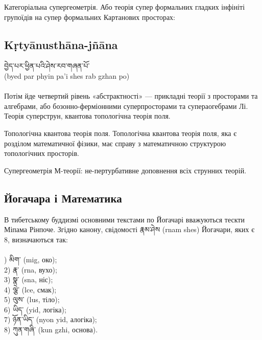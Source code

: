 Категоріальна супергеометрія. Або теорія супер формальних гладких інфініті групоїдів на
супер формальних Картанових просторах:

\subsection*{Kṛtyānusthāna-jñāna}

\ti བྱེད་པར་ཕྱིན་པའི་ཤེས་རབ་གཞན་པོ་ 
\\
\ua (byed par phyin pa'i shes rab gzhan po)\\
\\
Потім йде четвертий рівень «абстрактності» — прикладні теорії з просторами та алгебрами, або бозонно-ферміонними суперпросторами та супераогебрами Лі. Теорія суперструн, квантова топологічна теорія поля.

Топологічна квантова теорія поля. Топологічна квантова теорія поля, яка є розділом математичної фізики, має справу з математичною структурою топологічних просторів.

Супергеометрія М-теорії: не-пертурбативне доповнення всіх струнних теорій.

\subsection*{Йогачара і Математика}

В тибетському буддизмі основними текстами по Йогачарі вважуються тескти Міпама Рінпоче.
Згідно канону, свідомості \ti རྣམ་ཤེས  \ua (rnam shes) Йогачари, яких є 8, визначаються так:
\\
\\
\footnotesize
{}) \ti མིག་ \ua (mig, око);\\
2) \ti རྣ་ \ua (rna, вухо);\\
3) \ti སྣ་ \ua (sna, ніс);\\
4) \ti ལྕེ་ \ua (lce, смак);\\
5) \ti ལུས་ \ua (lus, тіло);\\
6) \ti ཡིད་ \ua (yid, логіка);\\
7) \ti ཉོན་ཡིད་  \ua (nyon yid, алогіка);\\
8) \ti ཀུན་གཞི་  \ua (kun gzhi, основа).\\
\normalsize

